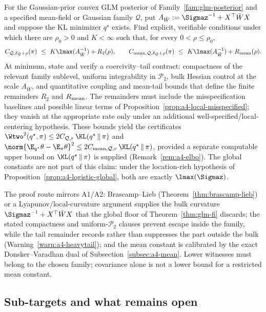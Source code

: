 \documentclass[../../main.tex]{subfiles}
\begin{document}
\begin{question}
\label{q:a4-certificate}
For the Gaussian-prior convex GLM posterior of Family~\ref{fam:glm-posterior} and a specified
mean-field or Gaussian family $\mathcal Q$, put
$A_{\bar W}:=\Sigmaz^{-1}+X^\top\bar W X$ and suppose the KL minimizer $q^\star$ exists. Find
explicit, verifiable conditions under which there are $\rho_0>0$ and $K<\infty$ such that, for
every $0<\rho\le\rho_0$,
\[
  C_{\mathcal Q,\delta_{\mathcal Q}+\rho}(\pi)
  \ \le\ K\lmax(A_{\bar W}^{-1})+R_2(\rho),
  \qquad
  C_{\mathrm{mean},\mathcal Q,\delta_{\mathcal Q}+\rho}(\pi)
  \ \le\ K\lmax(A_{\bar W}^{-1})+R_{\rm mean}(\rho).
\]
At minimum, state and verify a coercivity--tail contract: compactness of the relevant family
sublevel, uniform integrability in $\mathcal P_2$, bulk Hessian control at the scale
$A_{\bar W}$, and quantitative coupling and mean-tail bounds that define the finite remainders
$R_2$ and $R_{\rm mean}$. The remainders must include the misspecification baselines and possible linear terms of
Proposition~\ref{prop:a4-local-misspecified}; they vanish at the appropriate rate only under an additional
well-specified/local-centering hypothesis. These bounds yield the
certificates $\Wtwo^2(q^\star,\pi)\le2C_{\mathcal Q,r}\,\KL(q^\star\,\|\,\pi)$ and
$\norm{\E_{q^\star}\theta-\E_\pi\theta}^2\le2C_{\mathrm{mean},\mathcal Q,r}\,\KL(q^\star\,\|\,\pi)$,
provided a separate computable upper bound on $\KL(q^\star\,\|\,\pi)$ is supplied
(Remark~\ref{rem:a4-elbo}).
The global constants are not part of this claim: under the location-rich hypothesis of
Proposition~\ref{prop:a4-logistic-global}, both are exactly $\lmax(\Sigmaz)$.
\end{question}

\noindent The proof route mirrors A1/A2: Brascamp--Lieb (Theorem~\ref{thm:brascamp-lieb}) or a
Lyapunov/local-curvature argument supplies the bulk curvature
$\Sigmaz^{-1}+X^\top\bar W X$ that the global floor of Theorem~\ref{thm:glm-fi} discards;
the stated compactness and uniform-$\mathcal P_2$ clauses prevent escape inside the family, while
the tail remainder records rather than suppresses the part outside the bulk
(Warning~\ref{warn:a4-heavytail}); and the mean constant is calibrated by the exact
Donsker--Varadhan dual of Subsection~\ref{subsec:a4-mean}. Lower witnesses must belong to the
chosen family; covariance alone is not a lower bound for a restricted mean constant.

\subsection{Sub-targets and what remains open}
\label{subsec:a4-open}
\end{document}
